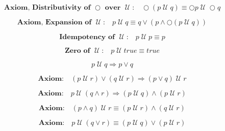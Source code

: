 \documentclass[fleqn, leqno]{article}
\newcommand{\until}{\;\mathcal{U}\;}
\newcommand{\next}{\bigcirc}
\newcommand{\spacer}{\vspace{-30pt}}
\begin{document}
\begin{equation}\label{E:distNextUntil}
\textbf{Axiom, Distributivity of $\next$ over $\until$:}\quad \next (p \until q) \equiv \next p \until \next q
\end{equation}

\spacer

\begin{equation}\label{E:expansionUntil}
\textbf{Axiom, Expansion of $\until$:}\quad p \until q \equiv q \lor (p \land \next (p \until q))
\end{equation}

\spacer

\begin{equation}\label{E:idemUntil}
\textbf{Idempotency of $\until$:}\quad p \until p \equiv p
\end{equation}

\spacer

\begin{equation}\label{E:zeroUntil}
\textbf{Zero of $\until$:}\quad p \until true \equiv true
\end{equation}

\spacer

\begin{equation}\label{E:untilImpOr}
p \until q \Rightarrow p \lor q
\end{equation}

\spacer

\begin{equation}\label{E:untilOrImp}
\textbf{Axiom:}\quad (p \until r) \lor (q \until r) \Rightarrow (p \lor q) \until r
\end{equation}

\spacer

\begin{equation}\label{E:untilAndImp}
\textbf{Axiom:}\quad p \until (q \land r) \Rightarrow (p \until q) \land (p \until r)
\end{equation}

\spacer

\begin{equation}\label{E:untilAndEquiv}
\textbf{Axiom:}\quad (p \land q) \until r \equiv (p \until r) \land (q \until r)
\end{equation}

\spacer

\begin{equation}\label{E:untilOrEquiv}
\textbf{Axiom:}\quad p \until (q \lor r) \equiv (p \until q) \lor (p \until r)
\end{equation}
\end{document}
